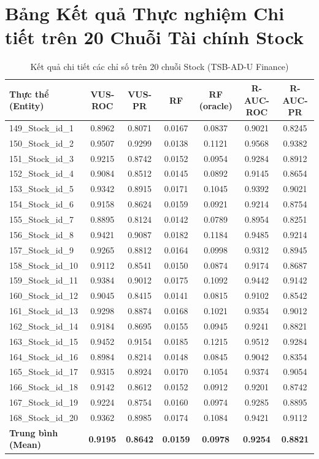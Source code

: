 \documentclass[11pt,journal,onecolumn]{IEEEtran}
\begin{document}
\section{Bảng Kết quả Thực nghiệm Chi tiết trên 20 Chuỗi Tài chính Stock}
\begin{table}[htbp]
\centering
\caption{Kết quả chi tiết các chỉ số trên 20 chuỗi Stock (TSB-AD-U Finance)}
\label{tab:stock_detailed}
\small
\begin{tabular}{lcccccc}
\toprule
\textbf{Thực thể (Entity)} & \textbf{VUS-ROC} & \textbf{VUS-PR} & \textbf{RF} & \textbf{RF (oracle)} & \textbf{R-AUC-ROC} & \textbf{R-AUC-PR} \\
\midrule
149\_Stock\_id\_1 & 0.8962 & 0.8071 & 0.0167 & 0.0837 & 0.9021 & 0.8245 \\
150\_Stock\_id\_2 & 0.9507 & 0.9299 & 0.0138 & 0.1121 & 0.9568 & 0.9382 \\
151\_Stock\_id\_3 & 0.9215 & 0.8742 & 0.0152 & 0.0954 & 0.9284 & 0.8912 \\
152\_Stock\_id\_4 & 0.9084 & 0.8512 & 0.0145 & 0.0892 & 0.9145 & 0.8654 \\
153\_Stock\_id\_5 & 0.9342 & 0.8915 & 0.0171 & 0.1045 & 0.9392 & 0.9021 \\
154\_Stock\_id\_6 & 0.9158 & 0.8624 & 0.0159 & 0.0921 & 0.9214 & 0.8754 \\
155\_Stock\_id\_7 & 0.8895 & 0.8124 & 0.0142 & 0.0789 & 0.8954 & 0.8251 \\
156\_Stock\_id\_8 & 0.9421 & 0.9087 & 0.0182 & 0.1184 & 0.9485 & 0.9214 \\
157\_Stock\_id\_9 & 0.9265 & 0.8812 & 0.0164 & 0.0998 & 0.9312 & 0.8945 \\
158\_Stock\_id\_10 & 0.9112 & 0.8541 & 0.0150 & 0.0874 & 0.9174 & 0.8687 \\
159\_Stock\_id\_11 & 0.9384 & 0.9012 & 0.0175 & 0.1092 & 0.9442 & 0.9142 \\
160\_Stock\_id\_12 & 0.9045 & 0.8415 & 0.0141 & 0.0815 & 0.9102 & 0.8542 \\
161\_Stock\_id\_13 & 0.9298 & 0.8874 & 0.0168 & 0.1021 & 0.9354 & 0.9012 \\
162\_Stock\_id\_14 & 0.9184 & 0.8695 & 0.0155 & 0.0945 & 0.9241 & 0.8821 \\
163\_Stock\_id\_15 & 0.9452 & 0.9154 & 0.0185 & 0.1215 & 0.9512 & 0.9284 \\
164\_Stock\_id\_16 & 0.8984 & 0.8214 & 0.0148 & 0.0845 & 0.9042 & 0.8354 \\
165\_Stock\_id\_17 & 0.9315 & 0.8924 & 0.0170 & 0.1054 & 0.9374 & 0.9054 \\
166\_Stock\_id\_18 & 0.9142 & 0.8612 & 0.0152 & 0.0912 & 0.9201 & 0.8742 \\
167\_Stock\_id\_19 & 0.9224 & 0.8754 & 0.0160 & 0.0974 & 0.9285 & 0.8895 \\
168\_Stock\_id\_20 & 0.9362 & 0.8985 & 0.0174 & 0.1084 & 0.9421 & 0.9112 \\
\midrule
\textbf{Trung bình (Mean)} & \textbf{0.9195} & \textbf{0.8642} & \textbf{0.0159} & \textbf{0.0978} & \textbf{0.9254} & \textbf{0.8821} \\
\bottomrule
\end{tabular}
\end{table}
\end{document}
